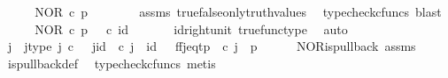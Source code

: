 \begin{isabellebody}
\ \ \isamarkupfalse%
\ \isamarkupfalse%
\ {\isachardoublequoteopen}NOR\ {\isasymcirc}\isactrlsub c\ {\isasymlangle}{\isasymt}{\isacharcomma}{\kern0pt}p{\isasymrangle}\ {\isacharequal}{\kern0pt}\ {\isasymt}{\isachardoublequoteclose}\isanewline
\ \ \ \ \isamarkupfalse%
\ assms\ true{\isacharunderscore}{\kern0pt}false{\isacharunderscore}{\kern0pt}only{\isacharunderscore}{\kern0pt}truth{\isacharunderscore}{\kern0pt}values\ \isamarkupfalse%
\ {\isacharparenleft}{\kern0pt}typecheck{\isacharunderscore}{\kern0pt}cfuncs{\isacharcomma}{\kern0pt}\ blast{\isacharparenright}{\kern0pt}\isanewline
\ \ \isamarkupfalse%
\ \isamarkupfalse%
\ {\isachardoublequoteopen}NOR\ {\isasymcirc}\isactrlsub c\ {\isasymlangle}{\isasymt}{\isacharcomma}{\kern0pt}p{\isasymrangle}\ {\isacharequal}{\kern0pt}\ {\isasymt}\ {\isasymcirc}\isactrlsub c\ id\ {\isasymone}{\isachardoublequoteclose}\isanewline
\ \ \ \ \isamarkupfalse%
\ id{\isacharunderscore}{\kern0pt}right{\isacharunderscore}{\kern0pt}unit{}\ true{\isacharunderscore}{\kern0pt}func{\isacharunderscore}{\kern0pt}type\ \isamarkupfalse%
\ auto\isanewline
\ \ \isamarkupfalse%
\ \isamarkupfalse%
\ j\ \ j{\isacharunderscore}{\kern0pt}type{\isacharcolon}{\kern0pt}\ {\isachardoublequoteopen}j\ {\isasymin}\isactrlsub c\ {\isasymone}{\isachardoublequoteclose}\ \ j{\isacharunderscore}{\kern0pt}id{\isacharcolon}{\kern0pt}\ {\isachardoublequoteopen}{\isasymbeta}\isactrlbsub {\isasymone}\isactrlesub \ {\isasymcirc}\isactrlsub c\ j\ {\isacharequal}{\kern0pt}\ id\ {\isasymone}{\isachardoublequoteclose}\ \ ff{\isacharunderscore}{\kern0pt}j{\isacharunderscore}{\kern0pt}eq{\isacharunderscore}{\kern0pt}tp{\isacharcolon}{\kern0pt}\ {\isachardoublequoteopen}{\isasymlangle}{\isasymf}{\isacharcomma}{\kern0pt}{\isasymf}{\isasymrangle}\ {\isasymcirc}\isactrlsub c\ j\ {\isacharequal}{\kern0pt}\ {\isasymlangle}{\isasymt}{\isacharcomma}{\kern0pt}p{\isasymrangle}{\isachardoublequoteclose}\isanewline
\ \ \ \ \isamarkupfalse%
\ NOR{\isacharunderscore}{\kern0pt}is{\isacharunderscore}{\kern0pt}pullback\ assms\ \isamarkupfalse%
\ is{\isacharunderscore}{\kern0pt}pullback{\isacharunderscore}{\kern0pt}def\ \isamarkupfalse%
\ {\isacharparenleft}{\kern0pt}typecheck{\isacharunderscore}{\kern0pt}cfuncs{\isacharcomma}{\kern0pt}\ metis{\isacharparenright}{\kern0pt}\isanewline
\ \ \isamarkupfalse%

\end{isabellebody}
